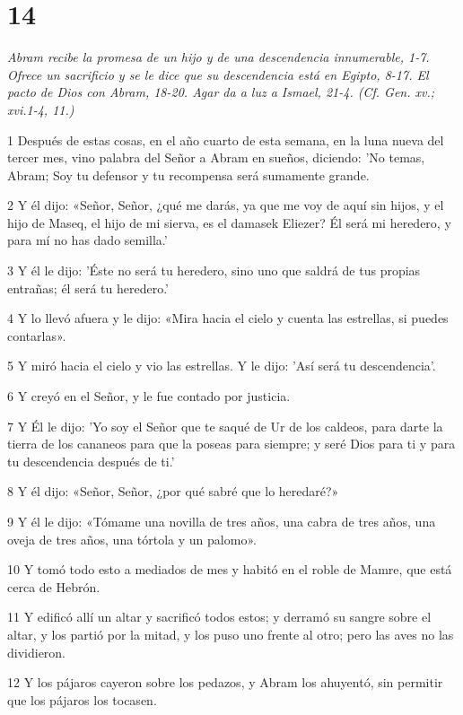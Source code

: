 \chapter{14}

\par \textit{Abram recibe la promesa de un hijo y de una descendencia innumerable, 1-7. Ofrece un sacrificio y se le dice que su descendencia está en Egipto, 8-17. El pacto de Dios con Abram, 18-20. Agar da a luz a Ismael, 21-4. (Cf. Gen. xv.; xvi.1-4, 11.)}


\par 1 Después de estas cosas, en el año cuarto de esta semana, en la luna nueva del tercer mes, vino palabra del Señor a Abram en sueños, diciendo: 'No temas, Abram; Soy tu defensor y tu recompensa será sumamente grande.
\par 2 Y él dijo: «Señor, Señor, ¿qué me darás, ya que me voy de aquí sin hijos, y el hijo de Maseq, el hijo de mi sierva, es el damasek Eliezer? Él será mi heredero, y para mí no has dado semilla.'
\par 3 Y él le dijo: 'Éste no será tu heredero, sino uno que saldrá de tus propias entrañas; él será tu heredero.'
\par 4 Y lo llevó afuera y le dijo: «Mira hacia el cielo y cuenta las estrellas, si puedes contarlas».
\par 5 Y miró hacia el cielo y vio las estrellas. Y le dijo: 'Así será tu descendencia'.
\par 6 Y creyó en el Señor, y le fue contado por justicia.
\par 7 Y Él le dijo: 'Yo soy el Señor que te saqué de Ur de los caldeos, para darte la tierra de los cananeos para que la poseas para siempre; y seré Dios para ti y para tu descendencia después de ti.'
\par 8 Y él dijo: «Señor, Señor, ¿por qué sabré que lo heredaré?»
\par 9 Y él le dijo: «Tómame una novilla de tres años, una cabra de tres años, una oveja de tres años, una tórtola y un palomo».
\par 10 Y tomó todo esto a mediados de mes y habitó en el roble de Mamre, que está cerca de Hebrón.
\par 11 Y edificó allí un altar y sacrificó todos estos; y derramó su sangre sobre el altar, y los partió por la mitad, y los puso uno frente al otro; pero las aves no las dividieron.
\par 12 Y los pájaros cayeron sobre los pedazos, y Abram los ahuyentó, sin permitir que los pájaros los tocasen.
